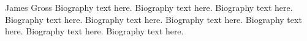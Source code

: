 \documentclass[10pt,journal,compsoc]{IEEEtran}
\theoremstyle{mytheoremstyle}
\theoremstyle{mytheoremstyle}
\theoremstyle{mytheoremstyle}
\begin{document}

\begin{IEEEbiography}{James Gross}
Biography text here.
Biography text here.
Biography text here.
Biography text here.
Biography text here.
Biography text here.
Biography text here.
Biography text here.
Biography text here.
\end{IEEEbiography}








\end{document}

